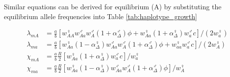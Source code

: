 \documentclass[12pt]{article}
\begin{document}


Similar equations can be derived for equilibrium (A) by substituting the equilibrium allele frequencies into Table \ref{tab:haplotype_growth}

\begin{subequations}\label{Ainvasion}
\begin{align}
\lambda_{mA}&= \frac{a}{b} \left[w_{AA}^\female w_{Aa}^\male w_A^\male (1+\alpha^\male_\Delta) \phi +  w_{Aa}^\female (1+\alpha^\female_\Delta) w_a^\male c \right] / (2 w_a^\female) \\
\lambda_{ma}&= \frac{a}{b} \left[ w_{Aa}^\female (1-\alpha^\female_\Delta) w_{Aa}^\male w_A^\male (1+\alpha^\male_\Delta) \phi +  w_{aa}^\female w_a^\male c \right] / (2 w_A^\female) \\
\chi_{mA}&= \frac{a}{b} \frac{R}{2} \left[   w_{Aa}^\female (1+\alpha^\female_\Delta) w_a^\male c \right] / w_a^\female\\ 
\chi_{ma}&= \frac{a}{b} \frac{R}{2} \left[ w_{Aa}^\female (1-\alpha^\female_\Delta) w_{Aa}^\male w_A^\male (1+\alpha^\male_\Delta) \phi \right] / w_A^\female
\end{align}
\end{subequations}
\end{document}
